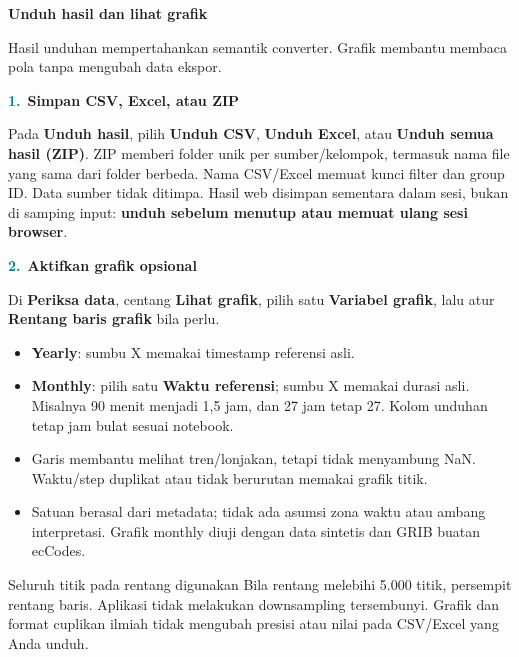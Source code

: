 \documentclass[11pt,a4paper]{article}
\newcommand{\step}[2]{\par\addvspace{2mm}\noindent\textcolor{teal}{\textbf{#1.}}\ \textbf{#2}\par\nobreak}
\newcommand{\pagetitle}[3]{\clearpage{\color{teal}\small\bfseries LANGKAH #1}\par{\color{slate}\LARGE\bfseries #2}\par\vspace{2mm}#3\par\vspace{3mm}}
\begin{document}
\pagetitle{11}{Unduh hasil dan lihat grafik}{Hasil unduhan mempertahankan semantik converter. Grafik membantu membaca pola tanpa mengubah data ekspor.}
\label{pg:web-results}
\step{1}{Simpan CSV, Excel, atau ZIP}
Pada \textbf{Unduh hasil}, pilih \textbf{Unduh CSV}, \textbf{Unduh Excel}, atau
\textbf{Unduh semua hasil (ZIP)}. ZIP memberi folder unik per sumber/kelompok,
termasuk nama file yang sama dari folder berbeda. Nama CSV/Excel memuat kunci
filter dan group ID. Data sumber tidak ditimpa.
Hasil web disimpan sementara dalam sesi, bukan di samping input:
\textbf{unduh sebelum menutup atau memuat ulang sesi browser}.
\step{2}{Aktifkan grafik opsional}
Di \textbf{Periksa data}, centang \textbf{Lihat grafik}, pilih satu
\textbf{Variabel grafik}, lalu atur \textbf{Rentang baris grafik} bila perlu.
\begin{center}
\end{center}
\begin{itemize}[itemsep=3pt]
\item \textbf{Yearly}: sumbu X memakai timestamp referensi asli.
\item \textbf{Monthly}: pilih satu \textbf{Waktu referensi}; sumbu X memakai
      durasi  asli. Misalnya 90 menit menjadi 1,5 jam, dan 27 jam
      tetap 27. Kolom  unduhan tetap jam bulat sesuai notebook.
\item Garis membantu melihat tren/lonjakan, tetapi tidak menyambung NaN.
      Waktu/step duplikat atau tidak berurutan memakai grafik titik.
\item Satuan berasal dari metadata; tidak ada asumsi zona waktu atau ambang
      interpretasi. Grafik monthly diuji dengan data sintetis dan GRIB buatan ecCodes.
\end{itemize}
\begin{panel}{Seluruh titik pada rentang digunakan}
Bila rentang melebihi 5.000 titik, persempit rentang baris. Aplikasi tidak
melakukan downsampling tersembunyi. Grafik dan format cuplikan ilmiah tidak
mengubah presisi atau nilai pada CSV/Excel yang Anda unduh.
\end{panel}
\end{document}

